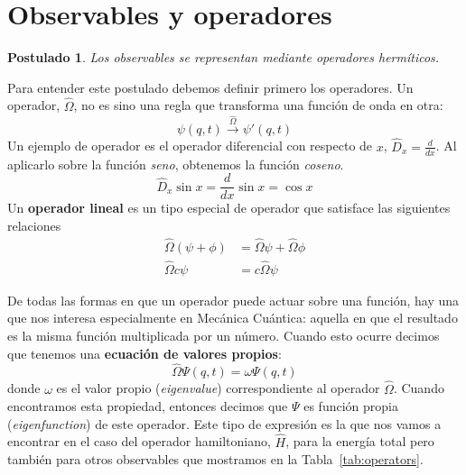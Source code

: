 \documentclass{tufte-handout}
\newtheorem{theorem}{Postulado}
\begin{document}
\section{Observables y operadores}
\begin{theorem}
Los observables se representan mediante operadores 
hermíticos.
\end{theorem}
Para entender este postulado debemos definir primero
los operadores. Un operador, $\hat{\Omega}$, no es sino una
regla que transforma una función de onda en otra:
\begin{equation}
    \psi(q,t)\xrightarrow{\hat{\Omega}}\psi'(q,t)
\end{equation}
Un ejemplo de operador es el operador
diferencial con respecto de $x$, $\hat{D}_x=\frac{d}{dx}$.
Al aplicarlo sobre la función \textit{seno}, obtenemos
la función \textit{coseno}.
\begin{equation}
    \hat{D}_x\sin x=\frac{d}{dx}\sin x =\cos x
\end{equation}
Un \textbf{operador lineal} es un tipo especial de operador
que satisface las siguientes relaciones
\begin{equation}
      \begin{array}{rl}
        \hat{\Omega}(\psi+\phi) &=\hat{\Omega}\psi + \hat{\Omega}\phi\\
        \hat{\Omega}c\psi &=c\hat{\Omega}\psi
    \end{array}
\end{equation}

De todas las formas en que un operador puede actuar sobre
una función, hay una que nos interesa especialmente en
Mecánica Cuántica: aquella en que el resultado es la misma
función multiplicada por un número. Cuando esto ocurre
decimos que tenemos una \textbf{ecuación de valores
propios}:
\begin{equation}
    \hat{\Omega}\Psi(q,t)=\omega\Psi(q,t)
\end{equation}
donde $\omega$ es el valor propio (\textit{eigenvalue})
correspondiente al operador $\hat{\Omega}$. Cuando
encontramos esta propiedad, entonces decimos que $\Psi$ 
es función propia (\textit{eigenfunction}) de este
operador. Este tipo de expresión es la que nos vamos a
encontrar en el caso del operador hamiltoniano, 
$\hat{H}$, para la energía total pero también para 
otros observables que mostramos en la 
Tabla~\ref{tab:operators}.
\end{document}
